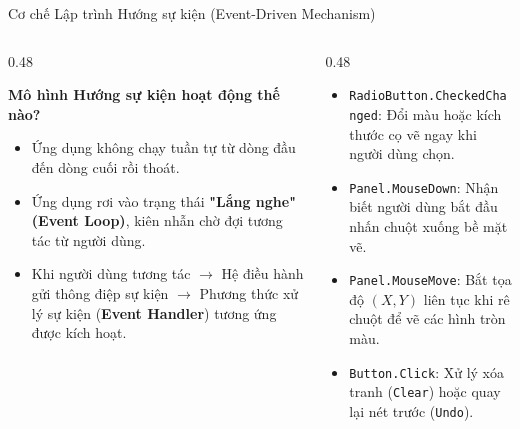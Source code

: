 \documentclass[aspectratio=169, 10pt]{beamer}
\begin{document}
\begin{frame}{Cơ chế Lập trình Hướng sự kiện (Event-Driven Mechanism)}
  \begin{columns}[T]
    \begin{column}{0.48\textwidth}
      \begin{block}{\textbf{Mô hình Hướng sự kiện hoạt động thế nào?}}
        \begin{itemize}
          \item Ứng dụng không chạy tuần tự từ dòng đầu đến dòng cuối rồi thoát.
          \item Ứng dụng rơi vào trạng thái \textbf{"Lắng nghe" (Event Loop)}, kiên nhẫn chờ đợi tương tác từ người dùng.
          \item Khi người dùng tương tác $\to$ Hệ điều hành gửi thông điệp sự kiện $\to$ Phương thức xử lý sự kiện (\textbf{Event Handler}) tương ứng được kích hoạt.
        \end{itemize}
      \end{block}
    \end{column}
    \begin{column}{0.48\textwidth}
      \begin{tcolorbox}[colback=CSharpPurple!5,colframe=CSharpPurple,title=\textbf{Các sự kiện trong Ứng dụng Painter}]
        \begin{itemize}\scriptsize
          \item \texttt{RadioButton.CheckedChanged}: Đổi màu hoặc kích thước cọ vẽ ngay khi người dùng chọn.
          \item \texttt{Panel.MouseDown}: Nhận biết người dùng bắt đầu nhấn chuột xuống bề mặt vẽ.
          \item \texttt{Panel.MouseMove}: Bắt tọa độ $(X, Y)$ liên tục khi rê chuột để vẽ các hình tròn màu.
          \item \texttt{Button.Click}: Xử lý xóa tranh (\texttt{Clear}) hoặc quay lại nét trước (\texttt{Undo}).
        \end{itemize}
      \end{tcolorbox}
    \end{column}
  \end{columns}
\end{frame}
\end{document}
